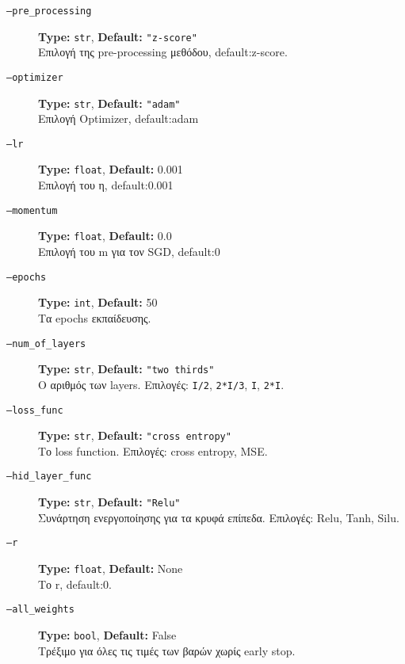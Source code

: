 \documentclass[a4paper,11pt]{article}
\begin{document}
\begin{description}
    \item[\texttt{--pre\_processing}] \textbf{Type:} \texttt{str}, \textbf{Default:} \texttt{"z-score"}\\
    Επιλογή της pre-processing μεθόδου, default:z-score.
  
    \item[\texttt{--optimizer}] \textbf{Type:} \texttt{str}, \textbf{Default:} \texttt{"adam"}\\
    Επιλογή Optimizer, default:adam
    \item[\texttt{--lr}] \textbf{Type:} \texttt{float}, \textbf{Default:} 0.001\\
    Επιλογή του η, default:0.001
  
    \item[\texttt{--momentum}] \textbf{Type:} \texttt{float}, \textbf{Default:} 0.0\\
    Επιλογή του m για τον SGD, default:0
  
    \item[\texttt{--epochs}] \textbf{Type:} \texttt{int}, \textbf{Default:} 50\\
    Τα epochs εκπαίδευσης.
  
    \item[\texttt{--num\_of\_layers}] \textbf{Type:} \texttt{str}, \textbf{Default:} \texttt{"two thirds"}\\
    Ο αριθμός των layers. Επιλογές: \texttt{I/2}, \texttt{2*I/3}, \texttt{I}, \texttt{2*I}.
  
    \item[\texttt{--loss\_func}] \textbf{Type:} \texttt{str}, \textbf{Default:} \texttt{"cross entropy"}\\
    Το loss function. Επιλογές: cross entropy, MSE.
  
    \item[\texttt{--hid\_layer\_func}] \textbf{Type:} \texttt{str}, \textbf{Default:} \texttt{"Relu"}\\
    Συνάρτηση ενεργοποίησης για τα κρυφά επίπεδα. Επιλογές: Relu, Tanh, Silu.
  
    \item[\texttt{--r}] \textbf{Type:} \texttt{float}, \textbf{Default:} None\\
    Το r, default:0.
  
    \item[\texttt{--all\_weights}] \textbf{Type:} \texttt{bool}, \textbf{Default:} False\\
    Τρέξιμο για όλες τις τιμές των βαρών χωρίς early stop.
  

\end{description}
\end{document}
